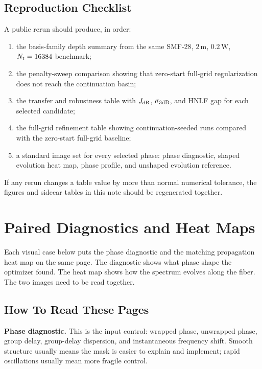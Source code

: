 \documentclass[11pt]{article}
\begin{document}
\subsection*{Reproduction Checklist}

A public rerun should produce, in order:
\begin{enumerate}
    \item the basis-family depth summary from the same SMF-28, \(2\,\mathrm{m}\),
    \(0.2\,\mathrm{W}\), \(N_t=16384\) benchmark;
    \item the penalty-sweep comparison showing that zero-start full-grid
    regularization does not reach the continuation basin;
    \item the transfer and robustness table with \(J_{\mathrm{dB}}\), \(\sigma_{3\mathrm{dB}}\),
    and HNLF gap for each selected candidate;
    \item the full-grid refinement table showing continuation-seeded runs
    compared with the zero-start full-grid baseline;
    \item a standard image set for every selected phase: phase diagnostic,
    shaped evolution heat map, phase profile, and unshaped evolution reference.
\end{enumerate}

If any rerun changes a table value by more than normal numerical tolerance, the
figures and sidecar tables in this note should be regenerated together.

\clearpage
\section{Paired Diagnostics and Heat Maps}

Each visual case below puts the phase diagnostic and the matching propagation
heat map on the same page. The diagnostic shows what phase shape the optimizer
found. The heat map shows how the spectrum evolves along the fiber. The two
images need to be read together.

\subsection*{How To Read These Pages}

\textbf{Phase diagnostic.} This is the input control: wrapped phase, unwrapped
phase, group delay, group-delay dispersion, and instantaneous frequency shift.
Smooth structure usually means the mask is easier to explain and implement;
rapid oscillations usually mean more fragile control.
\end{document}
